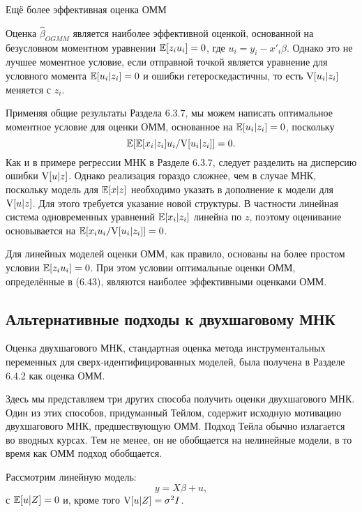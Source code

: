 \begin{center}
Ещё более эффективная оценка ОММ
\end{center}

Оценка $\hat{\beta}_{OGMM}$ является наиболее эффективной оценкой, основанной на безусловном моментном уравнении $\mathbb{E}[z_i u_i]=0$, где $u_i=y_i-x'_i\beta$. Однако это не лучшее моментное условие, если отправной точкой является уравнение для условного момента $\mathbb{E}[u_i|z_i]=0$ и ошибки гетероскедастичны, то есть $\mathrm{V}[u_i|z_i]$ меняется с $z_i$.

Применяя общие результаты Раздела 6.3.7, мы можем написать оптимальное моментное условие для оценки ОММ, основанное на $\mathbb{E}[u_i|z_i]=0$, поскольку
\begin{equation}
\mathbb{E}[\mathbb{E}[x_i|z_i]u_i/ \mathrm{V}[u_i|z_i]]=0.
\end{equation}
Как и в примере регрессии МНК в Разделе 6.3.7, следует разделить на дисперсию ошибки $\mathrm{V}[u|z]$. Однако реализация гораздо сложнее, чем в случае МНК, поскольку модель для $\mathbb{E}[x|z]$ необходимо указать в дополнение к модели для $\mathrm{V}[u|z]$. Для этого требуется указание новой структуры. В частности линейная система одновременных уравнений $\mathbb{E}[x_i|z_i]$ линейна по $z$, поэтому оценивание основывается на $\mathbb{E}[x_i u_i/\mathrm{V}[u_i|z_i]]=0$.

Для линейных моделей оценки ОММ, как правило, основаны на более простом условии $\mathbb{E}[z_i u_i]=0$. При этом условии оптимальные оценки ОММ, определённые в (6.43), являются наиболее эффективными оценками ОММ.

\subsection{Альтернативные подходы к двухшаговому МНК}

Оценка двухшагового МНК, стандартная оценка метода инструментальных переменных для сверх-идентифицированных моделей, была получена в Разделе 6.4.2 как оценка ОММ.

Здесь мы представляем три других способа получить оценки двухшагового МНК. Один из этих способов, придуманный Тейлом, содержит исходную мотивацию  двухшагового МНК, предшествующую ОММ. Подход Тейла обычно излагается во вводных курсах. Тем не менее, он не обобщается на нелинейные модели, в то время как ОММ подход обобщается.

Рассмотрим линейную модель:
\begin{equation}
y=X \beta+u,
\end{equation}
с $\mathbb{E}[u|Z]=0$ и, кроме того $\mathrm{V}[u|Z]=\sigma^2 I$.

